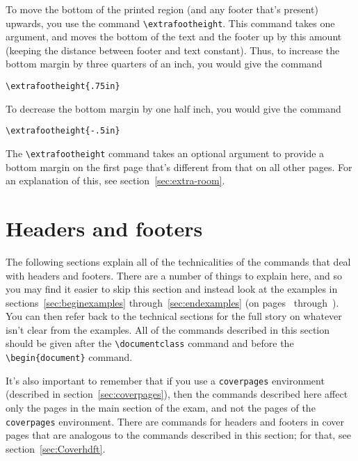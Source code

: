 \documentclass[12pt]{exam}
\begin{document}
To move the bottom of the printed region (and any footer that's
present) upwards, you use the command \verb"\extrafootheight".  This
command takes one argument, and moves the bottom of the text and the
footer up by this amount (keeping the distance between footer and text
constant).  Thus, to increase the bottom margin by three quarters of an
inch, you would give the command
\begin{center}
  \verb"\extrafootheight{.75in}"
\end{center}
To decrease the bottom margin by one half inch, you would give the
command
\begin{center}
  \verb"\extrafootheight{-.5in}"
\end{center}
The \verb"\extrafootheight" command takes an optional argument to
provide a bottom margin on the first page that's different from that
on all other pages.  For an explanation of this, see
section~\ref{sec:extra-room}.


\section{Headers and footers}
\label{sec:headfoot}

The following sections explain all of the technicalities of the
commands that deal with headers and footers.  There are a number of
things to explain here, and so you may find it easier to skip this
section and instead look at the examples in
sections~\ref{sec:beginexamples} through~\ref{sec:endexamples} (on
pages~\pageref{sec:beginexamples} through~\pageref{sec:endexamples}).
You can then refer back to the technical sections for the full story
on whatever isn't clear from the examples.  All of the commands
described in this section should be given after the
\verb"\documentclass" command and before the \verb"\begin{document}"
command.
  
It's also important to remember that if you use a \verb"coverpages"
environment (described in section~\ref{sec:coverpages}), then the
commands described here affect only the pages in the main section of
the exam, and not the pages of the \verb"coverpages" environment.
There are commands for headers and footers in cover pages that are
analogous to the commands described in this section; for that, see
section~\ref{sec:Coverhdft}.
\end{document}

